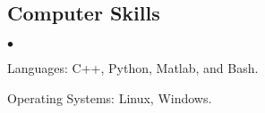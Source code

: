 \documentclass[margin,line]{res}
\newenvironment{list2}{
  \begin{list}{$\bullet$}{%
      \setlength{\itemsep}{0in}
      \setlength{\parsep}{0in} \setlength{\parskip}{0in}
      \setlength{\topsep}{0in} \setlength{\partopsep}{0in}
      \setlength{\leftmargin}{0.2in}}}{\end{list}}
\begin{document}
\begin{resume}
%
%
%
%

%
\section{\sc Computer Skills}
\begin{list2}
\item Languages:  C++, Python, Matlab, and Bash.
\item Operating Systems:  Linux, Windows.\\
\end{list2}
\vspace*{-.15in}


\end{resume}
\end{document}

